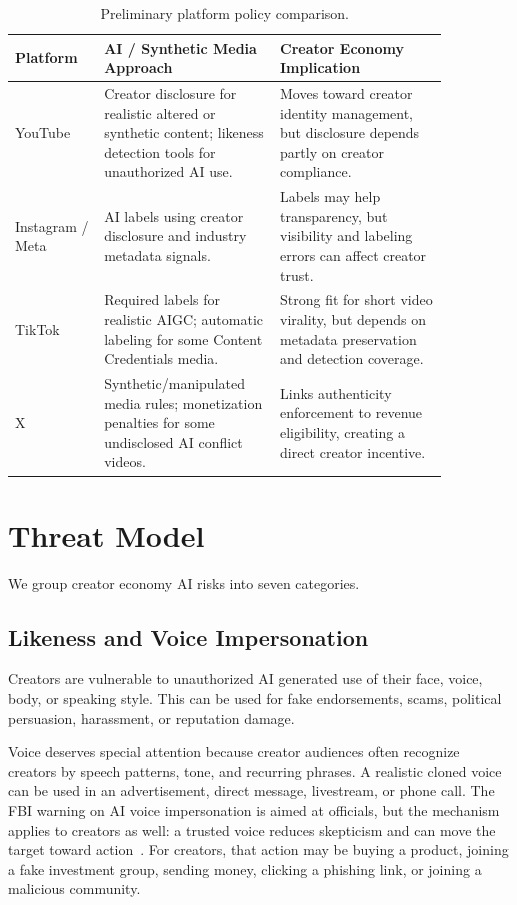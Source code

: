 \documentclass[11pt]{article}
\begin{document}
\begin{table}[h]
\centering
\small
\begin{tabular}{p{0.18\linewidth} p{0.34\linewidth} p{0.34\linewidth}}
\toprule
\textbf{Platform} & \textbf{AI / Synthetic Media Approach} & \textbf{Creator Economy Implication} \\
\midrule
YouTube & Creator disclosure for realistic altered or synthetic content; likeness detection tools for unauthorized AI use. & Moves toward creator identity management, but disclosure depends partly on creator compliance. \\
Instagram / Meta & AI labels using creator disclosure and industry metadata signals. & Labels may help transparency, but visibility and labeling errors can affect creator trust. \\
TikTok & Required labels for realistic AIGC; automatic labeling for some Content Credentials media. & Strong fit for short video virality, but depends on metadata preservation and detection coverage. \\
X & Synthetic/manipulated media rules; monetization penalties for some undisclosed AI conflict videos. & Links authenticity enforcement to revenue eligibility, creating a direct creator incentive. \\
\bottomrule
\end{tabular}
\caption{Preliminary platform policy comparison.}
\end{table}

\section{Threat Model}

We group creator economy AI risks into seven categories.

\subsection{Likeness and Voice Impersonation}

Creators are vulnerable to unauthorized AI generated use of their face, voice, body, or speaking style. This can be used for fake endorsements, scams, political persuasion, harassment, or reputation damage.

Voice deserves special attention because creator audiences often recognize creators by speech patterns, tone, and recurring phrases. A realistic cloned voice can be used in an advertisement, direct message, livestream, or phone call. The FBI warning on AI voice impersonation is aimed at officials, but the mechanism applies to creators as well: a trusted voice reduces skepticism and can move the target toward action~\cite{fbi2025officials}. For creators, that action may be buying a product, joining a fake investment group, sending money, clicking a phishing link, or joining a malicious community.
\end{document}
